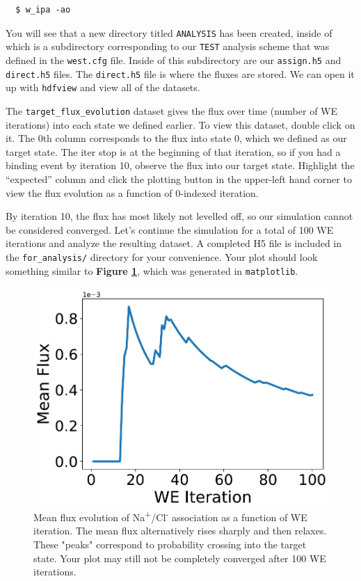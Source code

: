 \begin{verbatim}
  $ w_ipa -ao
\end{verbatim}

You will see that a new directory titled \verb|ANALYSIS| has been created, inside of which is a subdirectory corresponding to our \verb|TEST| analysis scheme that was defined in the \verb|west.cfg| file. 
Inside of this subdirectory are our \verb|assign.h5| and \verb|direct.h5| files. 
The \verb|direct.h5| file is where the fluxes are stored. 
We can open it up with \verb|hdfview| and view all of the datasets.
 
The \verb|target_flux_evolution| dataset gives the flux over time (number of WE iterations) into each state we defined earlier. 
To view this dataset, double click on it. 
The 0th column corresponds to the flux into state 0, which we defined as our target state. 
The iter stop is at the beginning of that iteration, so if you had a binding event by iteration 10, observe the  flux into our target state. 
Highlight the “expected” column and click the plotting button in the upper-left hand corner to view the flux evolution as a function of 0-indexed iteration.
 
By iteration 10, the flux has most likely not levelled off, so our simulation cannot be considered converged. 
Let’s continue the simulation for a total of 100 WE iterations and analyze the resulting dataset. 
A completed H5 file is included in the \verb|for_analysis/| directory for your convenience.
Your plot should look something similar to \textbf{Figure \ref{fig:nacl-flux}}, which was generated in \verb|matplotlib|. 

\begin{figure}[t]
\centering
\includegraphics[width=\linewidth]{figures/Figure5-2.pdf}
\caption{Mean flux evolution of Na\textsuperscript{+}/Cl\textsuperscript{-} association as a function of WE iteration. 
The mean flux alternatively rises sharply and then relaxes. 
These "peaks" correspond to probability crossing into the target state. 
Your plot may still not be completely converged after 100 WE iterations.}
\label{fig:nacl-flux}
\end{figure}

